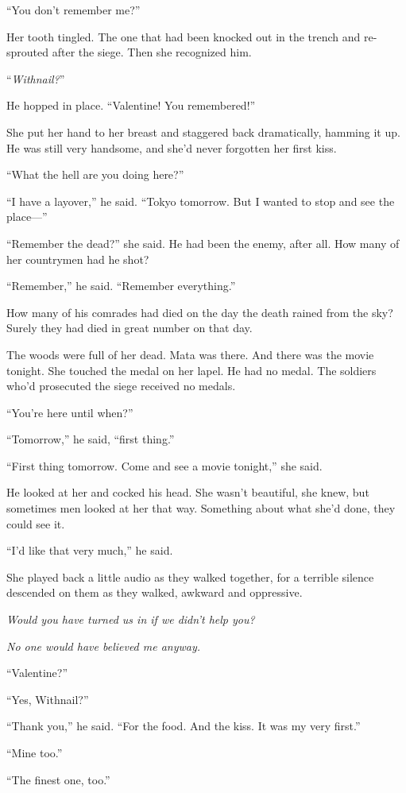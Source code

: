 “You don’t remember me?”

Her tooth tingled. The one that had been knocked out in the trench
and re-sprouted after the siege. Then she recognized him.

“\emph{Withnail?}”

He hopped in place. “Valentine! You remembered!”

She put her hand to her breast and staggered back dramatically,
hamming it up. He was still very handsome, and she’d never
forgotten her first kiss.

“What the hell are you doing here?”

“I have a layover,” he said. “Tokyo tomorrow. But I wanted to stop
and see the place---”

“Remember the dead?” she said. He had been the enemy, after all.
How many of her countrymen had he shot?

“Remember,” he said. “Remember everything.”

How many of his comrades had died on the day the death rained from
the sky? Surely they had died in great number on that day.

The woods were full of her dead. Mata was there. And there was the
movie tonight. She touched the medal on her lapel. He had no medal.
The soldiers who’d prosecuted the siege received no medals.

“You’re here until when?”

“Tomorrow,” he said, “first thing.”

“First thing tomorrow. Come and see a movie tonight,” she said.

He looked at her and cocked his head. She wasn’t beautiful, she
knew, but sometimes men looked at her that way. Something about
what she’d done, they could see it.

“I’d like that very much,” he said.

She played back a little audio as they walked together, for a
terrible silence descended on them as they walked, awkward and
oppressive.

\emph{Would you have turned us in if we didn’t help you?}

\emph{No one would have believed me anyway.}

“Valentine?”

“Yes, Withnail?”

“Thank you,” he said. “For the food. And the kiss. It was my very
first.”

“Mine too.”

“The finest one, too.”

